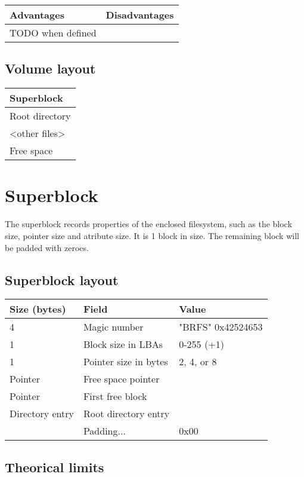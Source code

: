\documentclass[]{article}
\begin{document}
	\begin{tabularx}{\textwidth}{X|X}
		\textbf{Advantages} & \textbf{Disadvantages} \\
		\hline
		TODO when defined
	\end{tabularx}

	\subsection{Volume layout}

	\begin{tabular}{|l|} 
		\hline
		Superblock \\ 
		\hline	
		Root directory \\
		\hline
		\textless other files\textgreater \\
		\hline
		Free space \\
		\hline
	\end{tabular}

	\section{Superblock}
	
	The superblock records properties of the enclosed filesystem, such as the block size, pointer size and atribute size. It is 1 block in size. The remaining block will be padded with zeroes.
	
	\subsection{Superblock layout}
	
	\begin{tabular}{|l|l|l|} 
		\hline
		\textbf{Size (bytes)} & \textbf{Field} & \textbf{Value} \\ [0.5ex] 
		\hline
		4 & Magic number & "BRFS" 0x42524653  \\ 
		\hline
		1 & Block size in LBAs & 0-255 (+1) \\
		\hline
		1 & Pointer size in bytes & 2, 4, or 8 \\
		\hline
		Pointer & Free space pointer & \\
		\hline
		Pointer & First free block & \\
		\hline
		Directory entry & Root directory entry & \\
		\hline
		 & Padding... & 0x00 \\
		\hline	
	\end{tabular}

	\subsection{Theorical limits}
	
\end{document}
